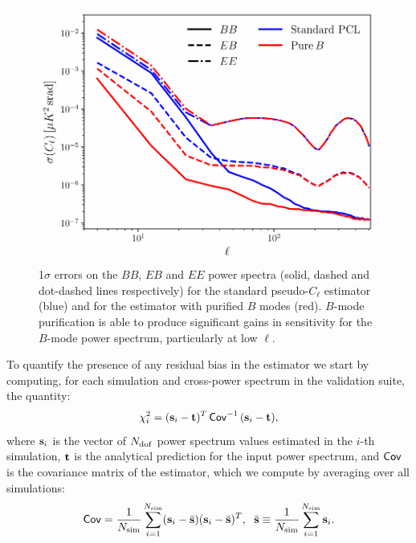 \documentclass[usenatbib]{mnrasb}
\begin{document}
\begin{figure}
      \end{figure}
      \begin{figure}
        \centering
        \includegraphics[width=0.99\columnwidth]{val_sigmas_cmb_sph}
        \caption{1$\sigma$ errors on the $BB$, $EB$ and $EE$ power spectra (solid, dashed and dot-dashed lines respectively) for the standard pseudo-$C_\ell$ estimator (blue) and for the estimator with purified $B$ modes (red). $B$-mode purification is able to produce significant gains in sensitivity for the $B$-mode power spectrum, particularly at low $\ell$.}\label{fig:cmb_val_sigma}
      \end{figure}
      To quantify the presence of any residual bias in the estimator we start by computing, for each simulation and cross-power spectrum in the validation suite, the quantity:
      \begin{equation}
        \chi^2_i=({\bf s}_i-{\bf t})^T\,{\sf Cov}^{-1}\,({\bf s}_i-{\bf t}),
      \end{equation}
      where ${\bf s}_i$ is the vector of $N_{\rm dof}$ power spectrum values estimated in the $i$-th simulation, ${\bf t}$ is the analytical prediction for the input power spectrum, and ${\sf Cov}$ is the covariance matrix of the estimator, which we compute by averaging over all simulations:
      \begin{equation}
        {\sf Cov}=\frac{1}{N_{\rm sim}}\sum_{i=1}^{N_{\rm sim}}({\bf s}_i-\bar{\bf s})({\bf s}_i-\bar{\bf s})^T,\hspace{6pt} \bar{\bf s}\equiv\frac{1}{N_{\rm sim}}\sum_{i=1}^{N_{\rm sim}}{\bf s}_i.
      \end{equation}
\end{document}
